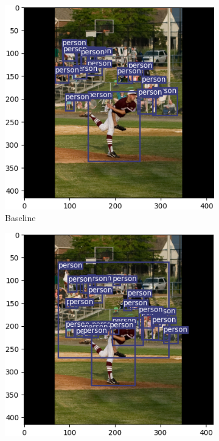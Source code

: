 \begin{figure}[!htbp]
\begin{subfigure}{.2\textwidth}
  \includegraphics[width=\textwidth]{images/base_baseball.png}
  \caption{Baseline}
  \label{fig:basebaseball}
\end{subfigure}%
\begin{subfigure}{.2\textwidth}
  \centering
  \includegraphics[width=\textwidth]{images/CBAM_baseball.png}

\end{subfigure}
\end{figure}
